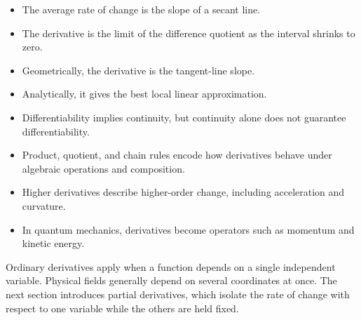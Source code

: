 \begin{booksummary}[Derivatives]
\begin{itemize}
\item The average rate of change is the slope of a secant line.
\item The derivative is the limit of the difference quotient as the interval shrinks to zero.
\item Geometrically, the derivative is the tangent-line slope.
\item Analytically, it gives the best local linear approximation.
\item Differentiability implies continuity, but continuity alone does not guarantee differentiability.
\item Product, quotient, and chain rules encode how derivatives behave under algebraic operations and composition.
\item Higher derivatives describe higher-order change, including acceleration and curvature.
\item In quantum mechanics, derivatives become operators such as momentum and kinetic energy.
\end{itemize}
\end{booksummary}

Ordinary derivatives apply when a function depends on a single independent variable. Physical fields generally depend on several coordinates at once. The next section introduces partial derivatives, which isolate the rate of change with respect to one variable while the others are held fixed.
